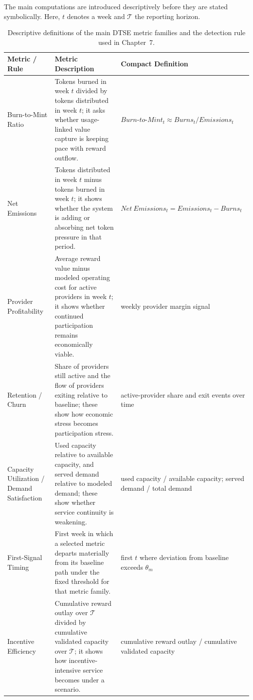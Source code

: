 The main computations are introduced descriptively before they are stated symbolically. Here, \(t\) denotes a week and \(\mathcal{T}\) the reporting horizon.

\begin{table}[H]
    \centering
    \small
    \setlength{\tabcolsep}{5pt}
    \renewcommand{\arraystretch}{1.15}
    \begin{tabularx}{\textwidth}{@{}>{\raggedright\arraybackslash}p{}>{\raggedright\arraybackslash}p{}X@{}}
        \toprule
        \textbf{Metric / Rule} & \textbf{Metric Description} & \textbf{Compact Definition} \\
        \midrule
        Burn-to-Mint Ratio & Tokens burned in week \(t\) divided by tokens distributed in week \(t\); it asks whether usage-linked value capture is keeping pace with reward outflow. & \(Burn\text{-}to\text{-}Mint_t \approx Burns_t / Emissions_t\) \\
        \addlinespace
        Net Emissions & Tokens distributed in week \(t\) minus tokens burned in week \(t\); it shows whether the system is adding or absorbing net token pressure in that period. & \(Net\ Emissions_t = Emissions_t - Burns_t\) \\
        \addlinespace
        Provider Profitability & Average reward value minus modeled operating cost for active providers in week \(t\); it shows whether continued participation remains economically viable. & weekly provider margin signal \\
        \addlinespace
        Retention / Churn & Share of providers still active and the flow of providers exiting relative to baseline; these show how economic stress becomes participation stress. & active-provider share and exit events over time \\
        \addlinespace
        Capacity Utilization / Demand Satisfaction & Used capacity relative to available capacity, and served demand relative to modeled demand; these show whether service continuity is weakening. & used capacity / available capacity; served demand / total demand \\
        \addlinespace
        First-Signal Timing & First week in which a selected metric departs materially from its baseline path under the fixed threshold for that metric family. & first \(t\) where deviation from baseline exceeds \(\theta_m\) \\
        \addlinespace
        Incentive Efficiency & Cumulative reward outlay over \(\mathcal{T}\) divided by cumulative validated capacity over \(\mathcal{T}\); it shows how incentive-intensive service becomes under a scenario. & cumulative reward outlay / cumulative validated capacity \\
        \bottomrule
    \end{tabularx}
    \caption[Descriptive metric definitions]{Descriptive definitions of the main DTSE metric families and the detection rule used in Chapter~7.}
    \label{tab:dtse_metric_plain_language}
\end{table}

